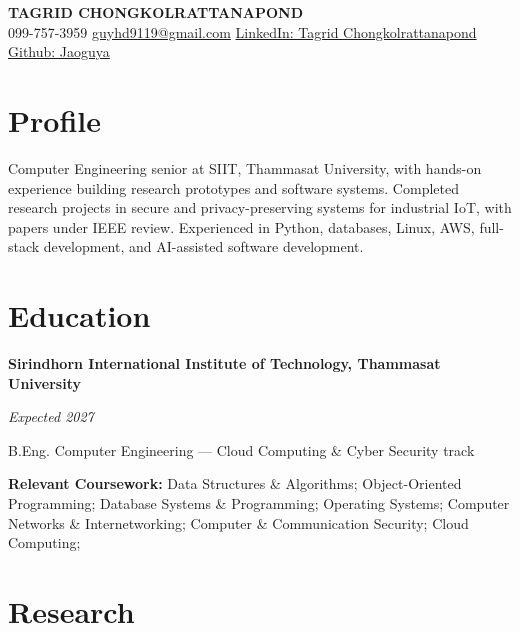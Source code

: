 \documentclass[11pt,a4paper]{article}
\newcommand{\entry}[2]{%
  \begin{minipage}[t]{0.85\textwidth}\raggedright #1\end{minipage}%
  \hfill%
  \begin{minipage}[t]{0.15\textwidth}\raggedleft\textit{#2}\end{minipage}%
  \par\vspace{1pt}%
}
\begin{document}
\begin{center}
  {\LARGE\scshape\bfseries TAGRID CHONGKOLRATTANAPOND}\\[4pt]
  099-757-3959 \hspace{0.05cm}\textbar\hspace{0.05cm}
  \href{mailto:guyhd9119@gmail.com}{guyhd9119@gmail.com}  \hspace{0.05cm}\textbar\hspace{0.05cm} \href{https://www.linkedin.com/in/tagrid-chongkolrattanapond-7188b63a8/}{LinkedIn: Tagrid Chongkolrattanapond} \hspace{0.05cm}\textbar\hspace{0.05cm} \href{https://github.com/Jaoguya}{Github: Jaoguya}
  
\end{center}
\vspace{-15pt}

\section{Profile}
Computer Engineering senior at SIIT, Thammasat University, with hands-on experience building research prototypes and software systems. Completed research projects in secure and privacy-preserving systems for industrial IoT, with papers under IEEE review. Experienced in Python, databases, Linux, AWS, full-stack development, and AI-assisted software development.


\section{Education}
\entry{\textbf{Sirindhorn International Institute of Technology, Thammasat University}}
      {Expected 2027}
B.Eng. Computer Engineering --- Cloud Computing \& Cyber Security track\par
\vspace{2pt}
\textbf{Relevant Coursework:} Data Structures \& Algorithms; Object-Oriented Programming; Database Systems \& Programming; Operating Systems; Computer Networks \& Internetworking; Computer \&
Communication Security; Cloud Computing;

\section{Research}
\end{document}
